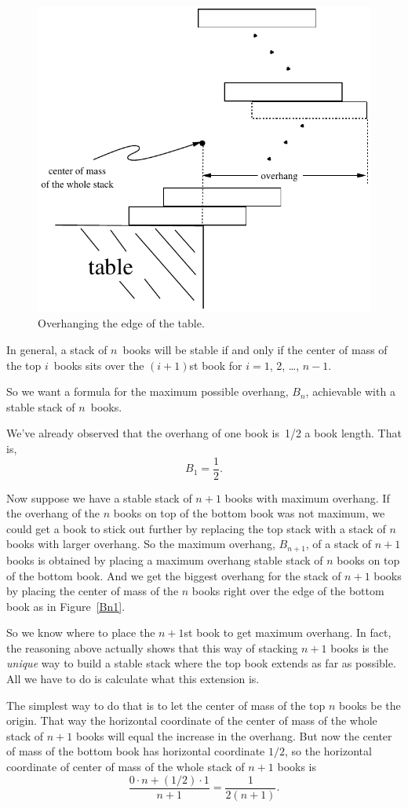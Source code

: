 \begin{figure}
\centerline{\includegraphics[width=.6\textwidth]{figures/drafts/bookstack-2}}
\caption{Overhanging the edge of the table.}
\label{overhang}
\end{figure}

In general, a stack of $n$~books will be stable if and only if the
center of mass of the top $i$~books sits over the $(i + 1)$st book
for $i = 1$, 2, \dots, $n - 1$.

So we want a formula for the maximum possible overhang, $B_n$, achievable
with a stable stack of $n$~books.

We've already observed that the overhang of one book is~1/2 a book
length.  That is,
\[
    B_1 = \frac{1}{2}.
\]

Now suppose we have a stable stack of $n+1$ books with maximum overhang.
If the overhang of the $n$ books on top of the bottom book was not
maximum, we could get a book to stick out further by replacing the top
stack with a stack of $n$ books with larger overhang.  So the maximum
overhang, $B_{n+1}$, of a stack of $n+1$ books is obtained by placing a
maximum overhang stable stack of $n$ books on top of the bottom book.  And
we get the biggest overhang for the stack of $n+1$ books by placing the
center of mass of the $n$ books right over the edge of the bottom book as
in Figure~\ref{Bn1}.

So we know where to place the $n+1$st book to get maximum overhang.
In fact, the reasoning above actually shows that this way of stacking
$n+1$ books is the \emph{unique} way to build a stable stack where the
top book extends as far as possible.  All we have to do is
calculate what this extension is.  

The simplest way to do that is to let the center of mass of the top
$n$ books be the origin.  That way the horizontal coordinate of the
center of mass of the whole stack of $n+1$ books will equal the
increase in the overhang.  But now the center of mass of the bottom
book has horizontal coordinate $1/2$, so the horizontal coordinate of
center of mass of the whole stack of $n+1$ books is
\[
\frac{0 \cdot n + (1/2) \cdot 1}{n+1} = \frac{1}{2(n +1)}.
\]

